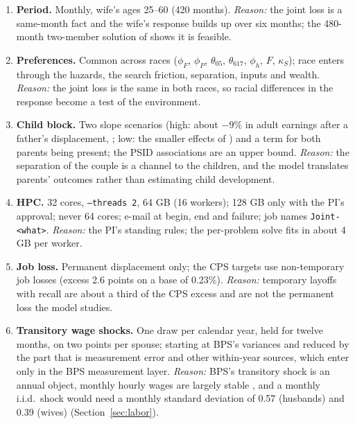 \documentclass[11pt]{article}
\newcommand{\code}[1]{\texttt{#1}}
\newcommand{\1}{\mathbf{1}}
\begin{document}
\begin{enumerate}[label=\textbf{D\arabic*.}, ref=D\arabic*, leftmargin=*]
  \item \label{od:period} \textbf{Period.} Monthly, wife's ages 25--60 (420 months). \emph{Reason:} the joint loss is a
  same-month fact and the wife's response builds up over six months; the 480-month two-member solution of
  \citet{bacher2025joint} shows it is feasible.
  \item \label{od:prefs} \textbf{Preferences.} Common across races ($\phi_F$, $\phi_P$, $\theta_{05}$, $\theta_{617}$,
  $\phi_h$, $F$, $\kappa_S$); race enters through the hazards, the search friction, separation, inputs and wealth.
  \emph{Reason:} the joint loss is the same in both races, so racial differences in the response become a test of the
  environment.
  \item \label{od:child} \textbf{Child block.} Two slope scenarios (high: about $-9\%$ in adult earnings after a
  father's displacement, \citealp{oreopoulos2008intergenerational}; low: the smaller effects of
  \citealp{hilger2016parental}) and a term for both parents being present; the PSID associations are an upper bound.
  \emph{Reason:} the separation of the couple is a channel to the children, and the model translates parents'
  outcomes rather than estimating child development.
  \item \label{od:hpc} \textbf{HPC.} 32 cores, \code{--threads 2}, 64 GB (16 workers); 128 GB only with the PI's
  approval; never 64 cores; e-mail at begin, end and failure; job names \code{Joint-<what>}. \emph{Reason:} the PI's
  standing rules; the per-problem solve fits in about 4 GB per worker.
  \item \label{od:recall} \textbf{Job loss.} Permanent displacement only; the CPS targets use non-temporary job losses
  (excess 2.6 points on a base of 0.23\%). \emph{Reason:} temporary layoffs with recall are about a third of the CPS
  excess and are not the permanent loss the model studies.
  \item \label{od:trans} \textbf{Transitory wage shocks.} One draw per calendar year, held for twelve months, on two
  points per spouse; starting at BPS's variances and reduced by the part that is measurement error and other
  within-year sources, which enter only in the BPS measurement layer. \emph{Reason:} BPS's transitory shock is an
  annual object, monthly hourly wages are largely stable \citep{ganong2026earnings}, and a monthly i.i.d.\ shock would
  need a monthly standard deviation of 0.57 (husbands) and 0.39 (wives) (Section~\ref{sec:labor}).

\end{enumerate}
\end{document}
